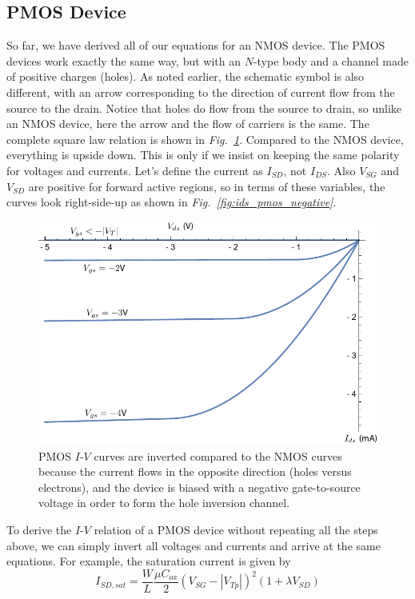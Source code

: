 \subsection{PMOS Device}
So far, we have derived all of our equations for an NMOS device.  The  PMOS devices work exactly the same way, but with an $N$-type body and a channel made of positive charges (holes).  As noted earlier, the schematic symbol is also different, with an arrow corresponding to the direction of current flow from the source to the drain.  Notice that holes do flow from the source to drain, so unlike an NMOS device, here the arrow and the flow of carriers is the same.  The complete square law relation is shown in \emph{Fig.~\ref{fig:idspmos}}.  Compared to the NMOS device, everything is upside down. This is only if we insist on keeping the same polarity for voltages and currents.  Let's define the current as $I_{SD}$, not $I_{DS}$.   Also $V_{SG}$ and $V_{SD}$ are positive for forward active regions, so in terms of these variables, the curves look right-side-up as shown in \emph{Fig.~\ref{fig:ids_pmos_negative}}.
\begin{figure}[tb]
\centering
\includegraphics[width=.75\columnwidth]{idspmos}
\caption{PMOS $I$-$V$ curves are inverted compared to the NMOS curves because the current flows in the opposite direction (holes versus electrons), and the device is biased with a negative gate-to-source voltage in order to form the hole inversion channel.}
\label{fig:idspmos}
\end{figure}
To derive the $I$-$V$ relation of a PMOS device without repeating all the steps above, we can simply invert all voltages and currents and arrive at the same equations.  For example, the saturation current is given by
    \begin{equation}
        {I_{SD,sat}} = \frac{W}{L}\frac{{\mu {C_{ox}}}}{2}{({V_{SG}} - {|V_{Tp}|})^2}(1 + \lambda {V_{SD}})
    \end{equation}

